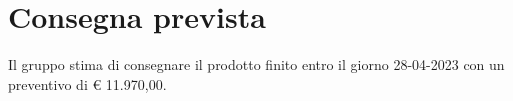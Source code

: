 \section{Consegna prevista}

Il gruppo stima di consegnare il prodotto finito entro il giorno 28-04-2023 con un preventivo di \euro{} 11.970,00.
